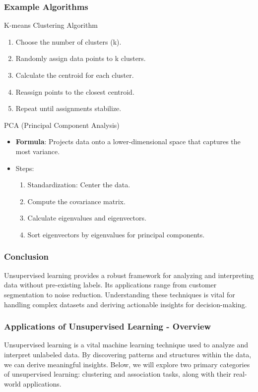\documentclass[aspectratio=169]{beamer}
\begin{document}
\begin{frame}[fragile]
  \frametitle{Example Algorithms}
  \begin{block}{K-means Clustering Algorithm}
    \begin{enumerate}
      \item Choose the number of clusters (k).
      \item Randomly assign data points to k clusters.
      \item Calculate the centroid for each cluster.
      \item Reassign points to the closest centroid.
      \item Repeat until assignments stabilize.
    \end{enumerate}
  \end{block}
  
  \begin{block}{PCA (Principal Component Analysis)}
     \begin{itemize}
       \item \textbf{Formula}: Projects data onto a lower-dimensional space that captures the most variance.
       \item Steps:
         \begin{enumerate}
           \item Standardization: Center the data.
           \item Compute the covariance matrix.
           \item Calculate eigenvalues and eigenvectors.
           \item Sort eigenvectors by eigenvalues for principal components.
         \end{enumerate}
     \end{itemize}
  \end{block}
\end{frame}

\begin{frame}[fragile]
  \frametitle{Conclusion}
  Unsupervised learning provides a robust framework for analyzing and interpreting data without pre-existing labels. Its applications range from customer segmentation to noise reduction. Understanding these techniques is vital for handling complex datasets and deriving actionable insights for decision-making.
\end{frame}

\begin{frame}[fragile]
  \frametitle{Applications of Unsupervised Learning - Overview}
  Unsupervised learning is a vital machine learning technique used to analyze and interpret unlabeled data. By discovering patterns and structures within the data, we can derive meaningful insights. Below, we will explore two primary categories of unsupervised learning: clustering and association tasks, along with their real-world applications.
\end{frame}
\end{document}
